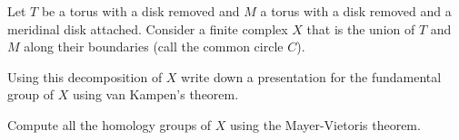 Let $T$ be a torus with a disk removed and $M$ a torus with a disk
removed and a meridinal disk attached. Consider a finite complex $X$
that is the union of $T$ and $M$ along their boundaries (call the
common circle $C$).
\begin{alist}
\item Using this decomposition of $X$ write down a presentation for
the fundamental group of $X$ using van Kampen's theorem.
\item Compute all the homology groups of $X$ using the Mayer-Vietoris
theorem.
\end{alist}
